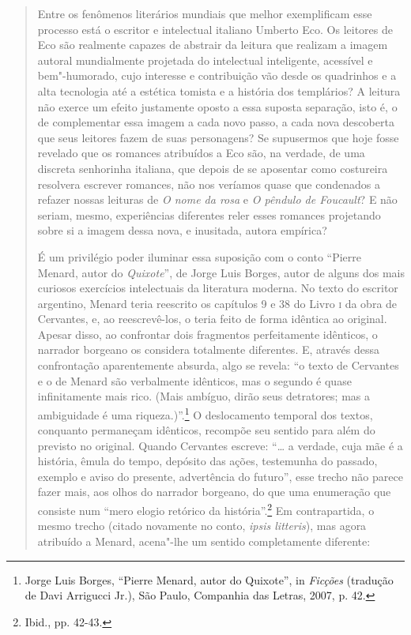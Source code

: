 \begin{quote}
Entre os fenômenos literários mundiais que melhor exemplificam esse
processo está o escritor e intelectual italiano Umberto Eco. Os leitores
de Eco são realmente capazes de abstrair da leitura que realizam a
imagem autoral mundialmente projetada do intelectual inteligente,
acessível e bem"-humorado, cujo interesse e contribuição vão desde os
quadrinhos e a alta tecnologia até a estética tomista e a história dos
templários? A leitura não exerce um efeito justamente oposto a essa
suposta separação, isto é, o de complementar essa imagem a cada novo
passo, a cada nova descoberta que seus leitores fazem de suas
personagens? Se supusermos que hoje fosse revelado que os romances
atribuídos a Eco são, na verdade, de uma discreta senhorinha italiana,
que depois de se aposentar como costureira resolvera escrever romances,
não nos veríamos quase que condenados a refazer nossas leituras de
\emph{O nome da rosa} e \emph{O pêndulo de Foucault}? E não seriam,
mesmo, experiências diferentes reler esses romances projetando sobre si
a imagem dessa nova, e inusitada, autora empírica?

É um privilégio poder iluminar essa suposição com o conto ``Pierre
Menard, autor do \emph{Quixote}'', de Jorge Luis Borges, autor de alguns
dos mais curiosos exercícios intelectuais da literatura moderna. No
texto do escritor argentino, Menard teria reescrito os capítulos 9 e 38
do Livro \textsc{i} da obra de Cervantes, e, ao reescrevê-los, o teria
feito de forma idêntica ao original. Apesar disso, ao confrontar dois
fragmentos perfeitamente idênticos, o narrador borgeano os considera
totalmente diferentes. E, através dessa confrontação aparentemente
absurda, algo se revela: ``o texto de Cervantes e o de Menard são
verbalmente idênticos, mas o segundo é quase infinitamente mais rico.
(Mais ambíguo, dirão seus detratores; mas a ambiguidade é uma
riqueza.)''.\footnote{Jorge Luis Borges, ``Pierre Menard, autor do
  Quixote'', in \emph{Ficções} (tradução de Davi Arrigucci Jr.), São
  Paulo, Companhia das Letras, 2007, p. 42.} O deslocamento temporal dos
textos, conquanto permaneçam idênticos, recompõe seu sentido para além
do previsto no original. Quando Cervantes escreve: ``\ldots{} a verdade, cuja
mãe é a história, êmula do tempo, depósito das ações, testemunha do
passado, exemplo e aviso do presente, advertência do futuro'', esse
trecho não parece fazer mais, aos olhos do narrador borgeano, do que uma
enumeração que consiste num ``mero elogio retórico da
história''.\footnote{Ibid., pp. 42-43.} Em contrapartida, o mesmo trecho
(citado novamente no conto, \emph{ipsis litteris}), mas agora atribuído
a Menard, acena"-lhe um sentido completamente diferente:


\end{quote}
